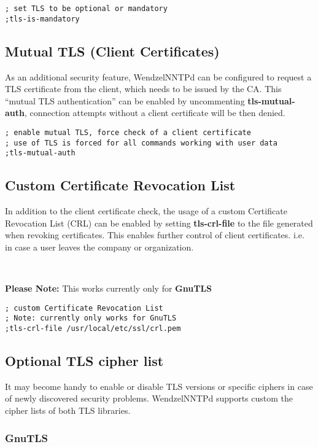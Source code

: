 \begin{verbatim}
; set TLS to be optional or mandatory
;tls-is-mandatory
\end{verbatim}

\subsection{Mutual TLS (Client Certificates)}

As an additional security feature, WendzelNNTPd can be configured to request a TLS certificate from the client, which needs to be issued by the CA. This ``mutual TLS authentication'' can be enabled by uncommenting \textbf{tls-mutual-auth}, connection attempts without a client certificate will be then denied.

\begin{verbatim}
; enable mutual TLS, force check of a client certificate
; use of TLS is forced for all commands working with user data
;tls-mutual-auth
\end{verbatim}

\subsection{Custom Certificate Revocation List}

In addition to the client certificate check, the usage of a custom Certificate Revocation List (CRL) can be enabled by setting \textbf{tls-crl-file} to the file generated when revoking certificates. This enables further control of client certificates. i.e. in case a user leaves the company or organization.

~

\textbf{Please Note:} This works currently only for \textbf{GnuTLS}

\begin{verbatim}
; custom Certificate Revocation List
; Note: currently only works for GnuTLS
;tls-crl-file /usr/local/etc/ssl/crl.pem
\end{verbatim}

\subsection{Optional TLS cipher list}

It may become handy to enable or disable TLS versions or specific ciphers in case of newly discovered security problems. WendzelNNTPd supports custom the cipher lists of both TLS libraries.

\subsubsection{GnuTLS}

